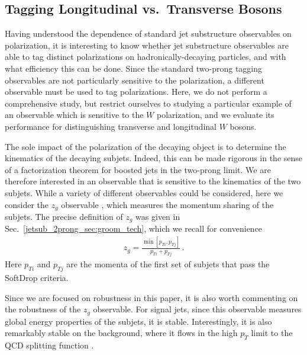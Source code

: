 \documentclass[11pt]{cernrep}
\begin{document}
\subsection{Tagging Longitudinal vs.\ Transverse Bosons}\label{jetsub_2prong_sec:polar_tag}

Having understood the dependence of standard jet substructure observables on polarization, it is interesting to know whether jet substructure observables are able to tag distinct polarizations on hadronically-decaying particles, and with what efficiency this can be done.
%
Since the standard two-prong tagging observables are not particularly sensitive to the polarization, a different observable must be used to tag polarizations.
%
Here, we do not perform a comprehensive study, but restrict ourselves to studying a particular example of an observable which is sensitive to the $W$ polarization, and we evaluate its performance for distinguishing transverse and longitudinal $W$ bosons. 

The sole impact of the polarization of the decaying object is to determine the kinematics of the decaying subjets.
%
Indeed, this can be made rigorous in the sense of a factorization theorem for boosted jets in the two-prong limit.
%
We are therefore interested in an observable that is sensitive to the kinematics of the two subjets.
%
While a variety of different observables could be considered, here we consider the $z_g$ observable \cite{Larkoski:2014wba,Larkoski:2014bia,Larkoski:2015lea}, which measures the momentum sharing of the subjets. The precise definition of $z_g$ was given in Sec.~\ref{jetsub_2prong_sec:groom_tech}, which we recall for convenience
\begin{align}
z_g=\frac{\min\left[ p_{Ti}, p_{Tj}  \right]}{p_{Ti}+p_{Tj}}\,.
\end{align}
Here $p_{Ti}$ and $p_{Tj}$ are the momenta of the first set of subjets that pass the SoftDrop criteria.


Since we are focused on robustness in this paper, it is also worth commenting on the robustness of the $z_g$ observable. For signal jets, since this observable measures global energy properties of the subjets, it is stable.
%
Interestingly, it is also remarkably stable on the background, where it flows in the high $p_T$ limit to the QCD splitting function \cite{Larkoski:2014wba,Larkoski:2014bia,Larkoski:2015lea}.
\end{document}
